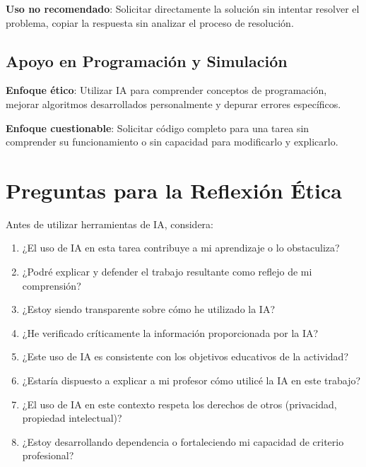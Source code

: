 \documentclass[11pt, letterpaper]{article}
\begin{document}
	\begin{casocaja}
		\textbf{Uso no recomendado}: Solicitar directamente la solución sin intentar resolver el problema, copiar la respuesta sin analizar el proceso de resolución.
	\end{casocaja}
	
	\subsection{Apoyo en Programación y Simulación}
	
	\begin{casocaja}
		\textbf{Enfoque ético}: Utilizar IA para comprender conceptos de programación, mejorar algoritmos desarrollados personalmente y depurar errores específicos.
	\end{casocaja}
	
	\begin{casocaja}
		\textbf{Enfoque cuestionable}: Solicitar código completo para una tarea sin comprender su funcionamiento o sin capacidad para modificarlo y explicarlo.
	\end{casocaja}
	
	\section{Preguntas para la Reflexión Ética}
	
	\begin{reflexioncaja}
		Antes de utilizar herramientas de IA, considera:
		
		\begin{enumerate}
			\item ¿El uso de IA en esta tarea contribuye a mi aprendizaje o lo obstaculiza?
			\item ¿Podré explicar y defender el trabajo resultante como reflejo de mi comprensión?
			\item ¿Estoy siendo transparente sobre cómo he utilizado la IA?
			\item ¿He verificado críticamente la información proporcionada por la IA?
			\item ¿Este uso de IA es consistente con los objetivos educativos de la actividad?
			\item ¿Estaría dispuesto a explicar a mi profesor cómo utilicé la IA en este trabajo?
			\item ¿El uso de IA en este contexto respeta los derechos de otros (privacidad, propiedad intelectual)?
			\item ¿Estoy desarrollando dependencia o fortaleciendo mi capacidad de criterio profesional?
		\end{enumerate}
	\end{reflexioncaja}
	
\end{document}
